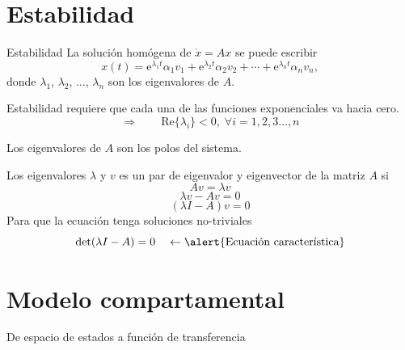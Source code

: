 \documentclass[presentation,aspectratio=169]{beamer}
\begin{document}
\section{Estabilidad}
\label{sec:orga469b44}

\begin{frame}[label={sec:org4dcda55}]{Estabilidad}
La solución homógena de \(\dot{x} = Ax\)  se puede escribir
\[ x(t) = \mathrm{e}^{\lambda_1 t}\alpha_1v_1 + \mathrm{e}^{\lambda_2 t}\alpha_2v_2 + \cdots + \mathrm{e}^{\lambda_n t}\alpha_nv_n,\]
donde \(\lambda_1\), \(\lambda_2\), \(\ldots\), \(\lambda_n\) son los \alert{eigenvalores} de \(A\). 

Estabilidad requiere que \alert{cada una} de las funciones exponenciales va hacia cero.
\[\Rightarrow \qquad \mathrm{Re}\{\lambda_i\} < 0, \; \forall i=1,2,3\ldots, n\]

Los eigenvalores de \(A\) son los \alert{polos} del sistema.
\end{frame}

\begin{frame}[label={sec:orgcfd4fee}]{Los eigenvalores}
\(\lambda\) y \(v\) es un par de eigenvalor y eigenvector de la matriz \(A\) si
\[Av = \lambda v\]
\pause
\[ \lambda v - Av = 0\]
\pause
\[ (\lambda I - A)v = 0\]
\pause
Para que la ecuación tenga soluciones no-triviales
 \[ \det (\lambda I - A) = 0 \quad \leftarrow \text{\alert{Ecuación característica}}\]
\end{frame}


\section{Modelo compartamental}
\label{sec:org52d7782}

\begin{frame}[label={sec:org11e4423}]{De espacio de estados a función de transferencia}
\end{frame}
\end{document}
